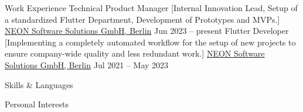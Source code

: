 \documentclass[
]{llresume}
\begin{document}
\begin{mainpane}
    \begin{mainsection}{Work Experience}
        \entryJob
            {Technical Product Manager}
            [Internal Innovation Lead, Setup of a standardized Flutter Department, Development of Prototypes and MVPs.]
            {\href{https://www.neon.dev/}{NEON Software Solutions GmbH, Berlin}}
            {Jun 2023 -- present}
        \entryJob
            {Flutter Developer}
            [Implementing a completely automated workflow for the setup of new projects to ensure company-wide quality and less redundant work.]
            {\href{https://www.neon.dev/}{NEON Software Solutions GmbH, Berlin}}
            {Jul 2021 -- May 2023}
    \end{mainsection}

    \begin{mainsection}{Skills \& Languages}
    \end{mainsection}

    \begin{mainsection}{Personal Interests}
    \end{mainsection}
\end{mainpane}
\end{document}
